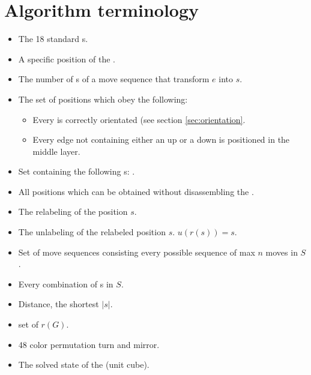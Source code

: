 \section{Algorithm terminology}
\begin{itemize}
\item {}The 18 standard \twist{}s.
\item {}A specific position of the \rubik{}.
\item {}The number of \twist{}s of a move sequence that transform $e$ into $s$.
\item {}The set of positions which obey the following:
\begin{itemize}
	\item Every \cpiece{} is correctly orientated (see section \ref{sec:orientation}.
	\item Every edge \cpiece{} not containing either an up \facelet{} or a down \facelet{} is positioned in the middle layer.
\end{itemize}
\item {}Set containing the following \twist{}s: .
\item {}All positions which can be obtained without disassembling the \rubik{}. 
\item {}The relabeling of the position $s$.
\item {}The unlabeling of the relabeled position $s$. $u(r(s))=s$.
\item {}Set of move sequences consisting every possible sequence of max $n$ moves in $S$.
\item {}Every combination of \twist{}s in $S$.
\item {}Distance, the shortest $|s|$.
\item {}set of $r(G)$.
\item {}48 color permutation turn and mirror.
\item {}The solved state of the \rubik{}(unit cube).
\end{itemize}

